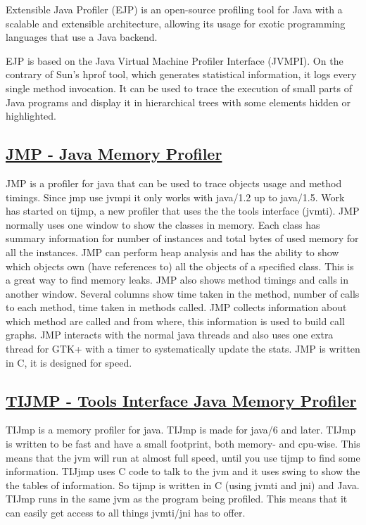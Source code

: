 Extensible Java Profiler (EJP) is an open-source profiling tool for Java with a scalable and extensible architecture, allowing its usage for exotic programming languages that use a Java backend.

EJP is based on the Java Virtual Machine Profiler Interface (JVMPI). On the contrary of Sun's hprof tool, which generates statistical information, it logs every single method invocation. It can be used to trace the execution of small parts of Java programs and display it in hierarchical trees with some elements hidden or highlighted.


\subsection{\href{http://www.khelekore.org/jmp/}{JMP - Java Memory Profiler}}

JMP is a profiler for java that can be used to trace objects usage and method timings. Since jmp use jvmpi it only works with java/1.2 up to java/1.5. Work has started on tijmp, a new profiler that uses the the tools interface (jvmti). JMP normally uses one window to show the classes in memory. Each class has summary information for number of instances and total bytes of used memory for all the instances. JMP can perform heap analysis and has the ability to show which objects own (have references to) all the objects of a specified class. This is a great way to find memory leaks. JMP also shows method timings and calls in another window. Several columns show time taken in the method, number of calls to each method, time taken in methods called. 
JMP collects information about which method are called and from where, this information is used to build call graphs. JMP interacts with the normal java threads and also uses one extra thread for GTK+ with a timer to systematically update the stats. JMP is written in C, it is designed for speed. 


\subsection{\href{http://www.khelekore.org/jmp/tijmp/}{TIJMP - Tools Interface Java Memory Profiler}}

TIJmp is a memory profiler for java. TIJmp is made for java/6 and later. TIJmp is written to be fast and have a small footprint, both memory- and cpu-wise. This means that the jvm will run at almost full speed, until you use tijmp to find some information. TIJjmp uses C code to talk to the jvm and it uses swing to show the the tables of information. So tijmp is written in C (using jvmti and jni) and Java. TIJmp runs in the same jvm as the program being profiled. This means that it can easily get access to all things jvmti/jni has to offer.


